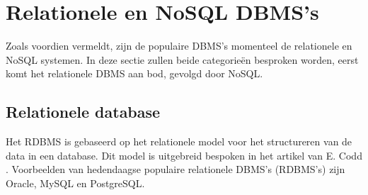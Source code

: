 %
%

\section{Relationele en NoSQL DBMS's} 
Zoals voordien vermeldt, zijn de populaire DBMS's momenteel de relationele en NoSQL systemen. In deze sectie zullen beide categorieën besproken worden, eerst komt het relationele DBMS aan bod, gevolgd door NoSQL. 

\subsection{Relationele database}
Het RDBMS is gebaseerd op het relationele model voor het structureren van de data in een database. Dit model is uitgebreid bespoken in het artikel van E. Codd \cite{codd1970relational}. Voorbeelden van hedendaagse populaire relationele DBMS's (RDBMS's) zijn Oracle, MySQL en PostgreSQL. 


